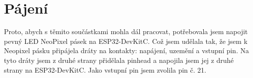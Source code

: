 \section{Pájení}

Proto, abych s těmito součástkami mohla dál pracovat, potřebovala jsem napojit pevný LED NeoPixel pásek na ESP32-DevKitC. Což jsem udělala tak, že jsem k Neopixel pásku připájela dráty na kontakty: napájení, uzemění a vstupní pin. Na tyto dráty jsem z druhé strany přidělala pinhead a napojila jsem jej z druhé strany na ESP32-DevKitC. Jako vstupní pin jsem zvolila pin č. 21.  



